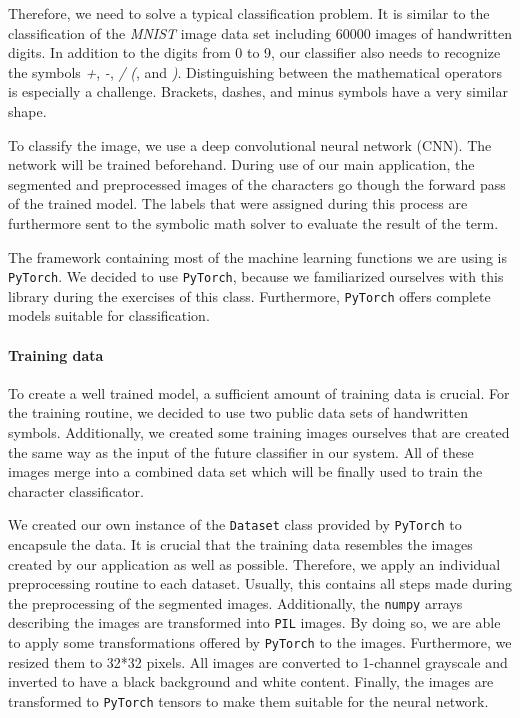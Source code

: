 \documentclass[11pt]{article}
\begin{document}
	Therefore, we need to solve a typical classification problem. It is similar to the classification of the \textit{MNIST} image data set including 60000 images of handwritten digits. In addition to the digits from 0 to 9, our classifier also needs to recognize the symbols \textit{+}, \textit{-}, \textit{/} \textit{(}, and \textit{)}. Distinguishing between the mathematical operators is especially a challenge. Brackets, dashes, and minus symbols have a very similar shape.
	
	To classify the image, we use a deep convolutional neural network (CNN). The network will be trained beforehand. During use of our main application, the segmented and preprocessed images of the characters go though the forward pass of the trained model. The labels that were assigned during this process are furthermore sent to the symbolic math solver to evaluate the result of the term. 
	
	The framework containing most of the machine learning functions we are using is \texttt{PyTorch}. We decided to use \texttt{PyTorch}, because we familiarized ourselves with this library during the exercises of this class. Furthermore, \texttt{PyTorch} offers complete models suitable for classification.
		
	
	\paragraph{Training data}
		To create a well trained model, a sufficient amount of training data is crucial. For the training routine, we decided to use two public data sets of handwritten symbols. Additionally, we created some training images ourselves that are created the same way as the input of the future classifier in our system. All of these images merge into a combined data set which will be finally used to train the character classificator.
		
		We created our own instance of the \texttt{Dataset} class provided by \texttt{PyTorch} to encapsule the data. It is crucial that the training data resembles the images created by our application as well as possible. Therefore, we apply an individual preprocessing routine to each dataset. Usually, this contains all steps made during the preprocessing of the segmented images. Additionally, the \texttt{numpy} arrays describing the images are transformed into \texttt{PIL} images. By doing so, we are able to apply some transformations offered by \texttt{PyTorch} to the images. Furthermore, we resized them to 32*32 pixels. All images are converted to 1-channel grayscale and inverted to have a black background and white content. Finally, the images are transformed to \texttt{PyTorch} tensors to make them suitable for the neural network. 
		
\end{document}
